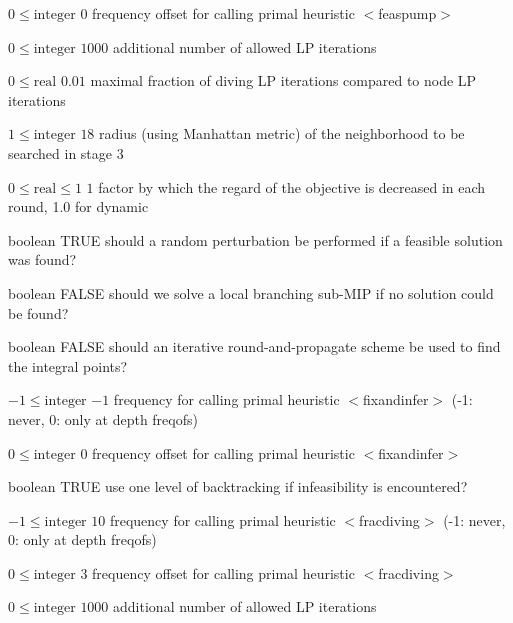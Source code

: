 %
{$0\leq\textrm{integer}$}%
{$0$}%
{frequency offset for calling primal heuristic $<$feaspump$>$}%
{}

%
{$0\leq\textrm{integer}$}%
{$1000$}%
{additional number of allowed LP iterations}%
{}

%
{$0\leq\textrm{real}$}%
{$0.01$}%
{maximal fraction of diving LP iterations compared to node LP iterations}%
{}

%
{$1\leq\textrm{integer}$}%
{$18$}%
{radius (using Manhattan metric) of the neighborhood to be searched in stage 3}%
{}

%
{$0\leq\textrm{real}\leq1$}%
{$1$}%
{factor by which the regard of the objective is decreased in each round, 1.0 for dynamic}%
{}

%
{boolean}%
{TRUE}%
{should a random perturbation be performed if a feasible solution was found?}%
{}

%
{boolean}%
{FALSE}%
{should we solve a local branching sub-MIP if no solution could be found?}%
{}

%
{boolean}%
{FALSE}%
{should an iterative round-and-propagate scheme be used to find the integral points?}%
{}

%
{$-1\leq\textrm{integer}$}%
{$-1$}%
{frequency for calling primal heuristic $<$fixandinfer$>$ (-1: never, 0: only at depth freqofs)}%
{}

%
{$0\leq\textrm{integer}$}%
{$0$}%
{frequency offset for calling primal heuristic $<$fixandinfer$>$}%
{}

%
{boolean}%
{TRUE}%
{use one level of backtracking if infeasibility is encountered?}%
{}

%
{$-1\leq\textrm{integer}$}%
{$10$}%
{frequency for calling primal heuristic $<$fracdiving$>$ (-1: never, 0: only at depth freqofs)}%
{}

%
{$0\leq\textrm{integer}$}%
{$3$}%
{frequency offset for calling primal heuristic $<$fracdiving$>$}%
{}

%
{$0\leq\textrm{integer}$}%
{$1000$}%
{additional number of allowed LP iterations}%
{}

